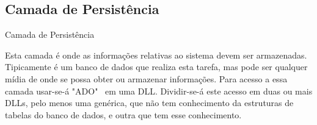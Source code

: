 	\subsection{Camada de Persistência}

	\begin{frame}
	
	\begin{CaixaModelo01}{Camada de Persistência}
	
		Esta camada é onde as informações relativas ao sistema devem ser armazenadas.
		Tipicamente é um banco de dados que realiza esta tarefa, mas pode ser qualquer mídia
		de onde se possa obter ou armazenar informações.
		\newline
		\newline
		Para acesso a essa camada usar-se-á	 "ADO" \, em uma DLL.
		Dividir-se-á este acesso em duas ou mais DLLs, pelo menos uma genérica, que não tem conhecimento
		da estruturas de tabelas do banco de dados, e outra que tem esse conhecimento.
		
	\end{CaixaModelo01}

	\end{frame}